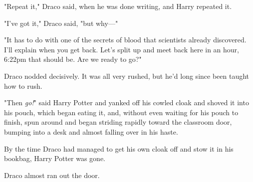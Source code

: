 "Repeat it," Draco said, when he was done writing, and Harry repeated it.

"I've got it," Draco said, "but why---"

"It has to do with one of the secrets of blood that scientists already 
discovered. I'll explain when you get back. Let's split up and meet back here 
in an hour, 6:22pm that should be. Are we ready to go?"

Draco nodded decisively. It was all very rushed, but he'd long since been 
taught how to rush.

"Then \emph{go!}" said Harry Potter and yanked off his cowled cloak and shoved 
it into his pouch, which began eating it, and, without even waiting for his 
pouch to finish, spun around and began striding rapidly toward the classroom 
door, bumping into a desk and almost falling over in his haste.

By the time Draco had managed to get his own cloak off and stow it in his 
bookbag, Harry Potter was gone.

Draco almost ran out the door.